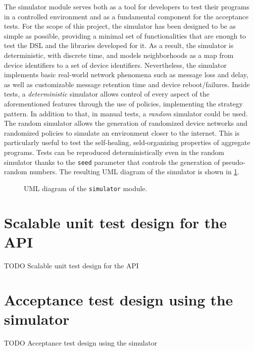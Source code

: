The simulator module serves both as a tool for developers to test their programs in a controlled environment and as a fundamental component for the acceptance tests.
%
For the scope of this project, the simulator has been designed to be as simple as possible, providing a minimal set of functionalities that are enough to test the \ac{DSL} and the libraries developed for it.
%
As a result, the simulator is deterministic, with discrete time, and models neighborhoods as a map from device identifiers to a set of device identifiers.
%
Nevertheless, the simulator implements basic real-world network phenomena such as message loss and delay, as well as customizable message retention time and device reboot/failures.
%
Inside tests, a \textit{deterministic} simulator allows control of every aspect of the aforementioned features through the use of policies, implementing the strategy pattern.
%
In addition to that, in manual tests, a \textit{random} simulator could be used.
%
The random simulator allows the generation of randomized device networks and randomized policies to simulate an environment closer to the internet.
%
This is particularly useful to test the self-healing, seld-organizing properties of aggregate programs.
%
Tests can be reproduced deterministically even in the random simulator thanks to the \texttt{seed} parameter that controls the generation of pseudo-random numbers.
%
The resulting \ac{UML} diagram of the simulator is shown in \cref{fig:simulator-uml}.

\begin{figure}
    \centering
    \caption{\ac{UML} diagram of the \texttt{simulator} module.}
    \label{fig:simulator-uml}
    \bigskip
    \resizebox{\linewidth}{!}{
        
    }
\end{figure}

\section{Scalable unit test design for the API}

TODO Scalable unit test design for the API


\section{Acceptance test design using the simulator}

TODO Acceptance test design using the simulator
